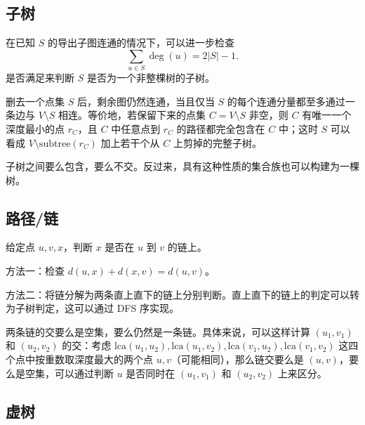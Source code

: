 \subsection{子树}

在已知 $S$ 的导出子图连通的情况下，可以进一步检查
$$
    \sum_{u\in S}\deg(u)=2|S|-1.
$$
是否满足来判断 $S$ 是否为一个非整棵树的子树。

删去一个点集 $S$ 后，剩余图仍然连通，当且仅当 $S$ 的每个连通分量都至多通过一条边与 $V\setminus S$ 相连。等价地，若保留下来的点集 $C=V\setminus S$ 非空，则 $C$ 有唯一一个深度最小的点 $r_C$，且 $C$ 中任意点到 $r_C$ 的路径都完全包含在 $C$ 中；这时 $S$ 可以看成 $V\setminus \mathrm{subtree}(r_C)$ 加上若干个从 $C$ 上剪掉的完整子树。


\begin{exercise}[P8990]
\end{exercise}

子树之间要么包含，要么不交。反过来，具有这种性质的集合族也可以构建为一棵树。

\subsection{路径/链}


\begin{exercise}[判断点是否在链上]
    给定点 $u,v,x$，判断 $x$ 是否在 $u$ 到 $v$ 的链上。
\end{exercise}
\begin{solution}
    方法一：检查 $d(u,x)+d(x,v)=d(u,v)$。

    方法二：将链分解为两条直上直下的链上分别判断。直上直下的链上的判定可以转为子树判定，这可以通过 DFS 序实现。
\end{solution}

\begin{property}
    两条链的交要么是空集，要么仍然是一条链。具体来说，可以这样计算 $(u_1,v_1)$ 和 $(u_2,v_2)$ 的交：考虑 $\mathrm{lca}(u_1,u_2),\mathrm{lca}(u_1,v_2),\mathrm{lca}(v_1,u_2),\mathrm{lca}(v_1,v_2)$ 这四个点中按重数取深度最大的两个点 $u,v$（可能相同），那么链交要么是 $(u,v)$，要么是空集，可以通过判断 $u$ 是否同时在 $(u_1,v_1)$ 和 $(u_2,v_2)$ 上来区分。
\end{property}

\subsection{虚树}

